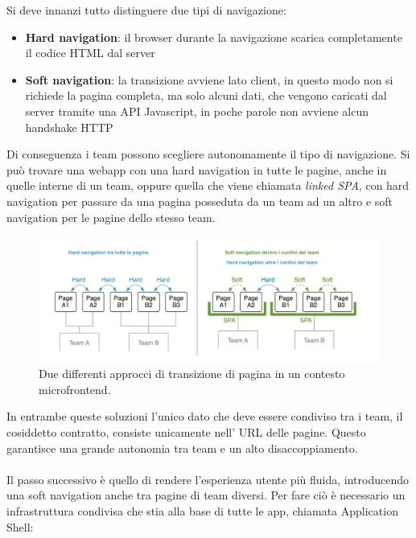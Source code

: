 Si deve innanzi tutto distinguere due tipi di navigazione:
\begin{itemize}
    \item \textbf{Hard navigation}: il browser durante la navigazione scarica completamente il codice HTML dal server
    \item \textbf{Soft navigation}: la transizione avviene lato client, in questo modo non si richiede la pagina completa,
     ma solo alcuni dati, che vengono caricati dal server tramite una API Javascript, in poche parole non avviene alcun handshake HTTP
\end{itemize}
Di conseguenza i team possono scegliere autonomamente il tipo di navigazione.
Si può trovare una webapp con una hard navigation in tutte le pagine, anche in quelle interne di un team,
oppure quella che viene chiamata \emph{linked SPA}, con hard navigation per passare da una pagina posseduta da un team ad un altro
e soft navigation per le pagine dello stesso team.
\begin{figure}[H]
    \centering
    \includegraphics[width=148mm]{img/navigazione}
    \caption{Due differenti approcci di transizione di pagina in un contesto microfrontend.}
  \end{figure}
In entrambe queste soluzioni l'unico dato che deve essere condiviso tra i team, il cosiddetto contratto, consiste 
unicamente nell' URL delle pagine. Questo garantisce una grande autonomia tra team e un alto disaccoppiamento.
\\\\
Il passo successivo è quello di rendere l'esperienza utente più fluida, introducendo una soft navigation anche tra pagine di team 
diversi. Per fare ciò è necessario un infrastruttura condivisa che stia alla base di tutte le app, chiamata Application Shell:


